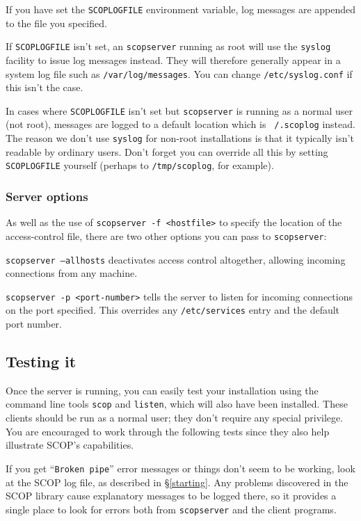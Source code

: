 \documentclass[12pt,a4paper,twoside]{article}
\renewcommand{\_}{\texttt{\symbol{95}}}
\begin{document}
If you have set the \texttt{SCOP\_LOGFILE} environment variable,
log messages are appended to the file you specified.

If \texttt{SCOP\_LOGFILE} isn't set, an \texttt{scopserver} running as
root will use the \texttt{syslog} facility to issue log messages
instead. They will therefore generally appear in a system log file such
as \texttt{/var/log/messages}. You can change \texttt{/etc/syslog.conf}
if this isn't the case.

In cases where \texttt{SCOP\_LOGFILE} isn't set but \texttt{scopserver}
is running as a normal user (not root), messages are logged to a
default location which is \texttt{~/.scoplog} instead. The reason we
don't use \texttt{syslog} for non-root installations is that it
typically isn't readable by ordinary users. Don't forget you can
override all this by setting \texttt{SCOP\_LOGFILE} yourself (perhaps
to \texttt{/tmp/scoplog}, for example).

\subsubsection*{Server options}

As well as the use of \texttt{scopserver -f <hostfile>} to specify
the location of the access-control file, there are two other options
you can pass to \texttt{scopserver}:

\texttt{scopserver --allhosts} deactivates access control altogether,
allowing incoming connections from any machine.

\texttt{scopserver -p <port-number>} tells the server to listen
for incoming connections on the port specified. This overrides
any \texttt{/etc/services} entry and the default port number.

\subsection{Testing it}
\label{testing}

Once the server is running, you can easily test your installation using
the command line tools \texttt{scop} and \texttt{listen}, which will
also have been installed. These clients should be run as a normal
user; they don't require any special privilege. You are encouraged
to work through the following tests since they also help illustrate
SCOP's capabilities.

If you get ``\texttt{Broken pipe}'' error messages or
things don't seem to be working, look at the SCOP log file, as
described in \S\ref{starting}. Any problems discovered in the SCOP
library cause explanatory messages to be logged there, so it provides a
single place to look for errors both from \texttt{scopserver} and the
client programs.
\end{document}
